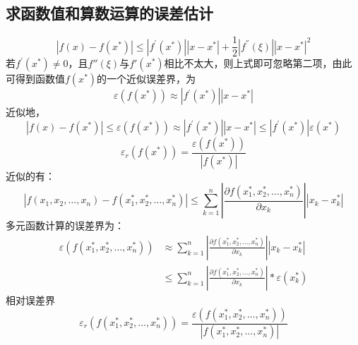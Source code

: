 \documentclass[a4paper]{article}
\begin{document}
\subsection{求函数值和算数运算的误差估计}
\begin{equation}
|f(x)-f(x^*)| \le |f^{'}(x^*)||x-x^*|+\frac{1}{2}|f^{''}(\xi)||x-x^*|^2
\end{equation}
若$f^{'}(x^*) \neq 0$，且$f{''}(\xi)$与$f{'}(x^*)$相比不太大，则上式即可忽略第二项，由此可得到函数值$f(x^*)$的一个近似误差界，为
\begin{equation}
\varepsilon(f(x^*)) \approx |f^{'}(x^*)||x-x^*|
\end{equation}
近似地，
\begin{equation}
|f(x)-f(x^*)| \le \varepsilon(f(x^*)) \approx |f^{'}(x^*)||x-x^*| \le |f^{'}(x^*)|\varepsilon(x^*)
\end{equation}
\begin{equation}
\varepsilon_r (f(x^*))=\frac{\varepsilon(f(x^*))}{|f(x^*)|}
\end{equation}
近似的有：
\begin{equation}
|f(x_1, x_2, \dots, x_n)-f(x_1^*,x_2^*, \dots, x_n^*)| \le \sum_{k=1}^{n}|\frac{\partial f(x_1^*,x_2^*, \dots, x_n^*)}{\partial x_k}||x_k-x_k^*|
\end{equation}
多元函数计算的误差界为：
\begin{equation}
\begin{split}
\varepsilon(f(x_1^*,x_2^*, \dots, x_n^*)) 
& \approx \sum_{k=1}^{n}|\frac{\partial f(x_1^*,x_2^*, \dots, x_n^*)}{\partial x_k}||x_k-x_k^*|  \\
& \le \sum_{k=1}^{n}|\frac{\partial f(x_1^*,x_2^*, \dots, x_n^*)}{\partial x_k}|*\varepsilon(x_k^*)
\end{split}
\end{equation}
相对误差界
\begin{equation}
\varepsilon_r(f(x_1^*,x_2^*, \dots, x_n^*)) = \frac{\varepsilon(f(x_1^*,x_2^*, \dots, x_n^*))}{|f(x_1^*,x_2^*, \dots, x_n^*)|}
\end{equation}
\end{document}
